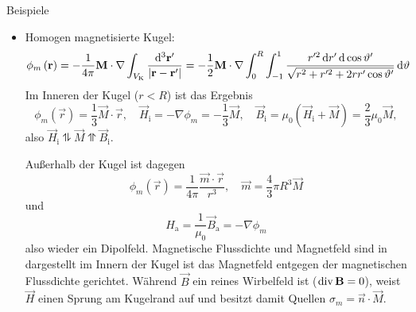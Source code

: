 Beispiele
\begin{itemize}
	\item Homogen magnetisierte Kugel:
	      \begin{equation*}
		      \phi _{m}\left(\mathbf{r}\right)=-\frac{1}{4\pi }\mathbf{M}\cdot \nabla \int _{V_{\mathrm{K}}}\frac{\mathop{}\!\mathrm{d} ^{3}\mathbf{r}'}{\left| \mathbf{r}-\mathbf{r}'\right| }=-\frac{1}{2}\mathbf{M}\cdot \nabla \int _{0}^{R}\int _{-1}^{1}\frac{r'^{2}\mathop{}\!\mathrm{d} r'\mathop{}\!\mathrm{d} \cos \vartheta '}{\sqrt{r^{2}+r'^{2}+2rr'\cos \vartheta '}}\mathop{}\!\mathrm{d} \vartheta
	      \end{equation*}
	      Im Inneren der Kugel ($r<R$) ist das Ergebnis
	      \begin{equation*}
		      \phi _{m}\left(\vec {r}\right)=\frac{1}{3}\vec {M}\cdot \vec {r}, \quad\vec {H}_{\mathrm{i}}=-\nabla \phi _{m}=-\frac{1}{3}\vec {M},\quad \vec {B}_{\mathrm{i}}=\mu _{0}\left(\vec {H}_{\mathrm{i}}+\vec {M}\right)=\frac{2}{3}\mu _{0}\vec {M},
	      \end{equation*}
	      also $\vec {H}_{\mathrm{i}}\updownharpoons \vec {M}\upupharpoons \vec {B}_{\mathrm{i}}$.

	      Außerhalb der Kugel ist dagegen
	      \begin{equation*}
		      \phi _{m}\left(\vec {r}\right)=\frac{1}{4\pi }\frac{\vec {m}\cdot \vec {r}}{r^{3}},\quad \vec {m}=\frac{4}{3}\pi R^{3}\vec {M}
	      \end{equation*}
	      und
	      \begin{equation*}
		      H_{\mathrm{a}}=\frac{1}{\mu _{0}}\vec {B}_{\mathrm{a}}=-\nabla \phi _{m}
	      \end{equation*}
	      also wieder ein Dipolfeld. Magnetische Flussdichte und Magnetfeld sind in  dargestellt \textendash{} im Innern der Kugel ist das Magnetfeld entgegen der magnetischen Flussdichte gerichtet. Während $\vec {B}$ ein reines Wirbelfeld ist ($\operatorname{div} \mathbf{B}=0$), weist $\vec {H}$ einen Sprung am Kugelrand auf und besitzt damit Quellen $\sigma _{m}=\vec {n}\cdot \vec {M}$.


\end{itemize}
